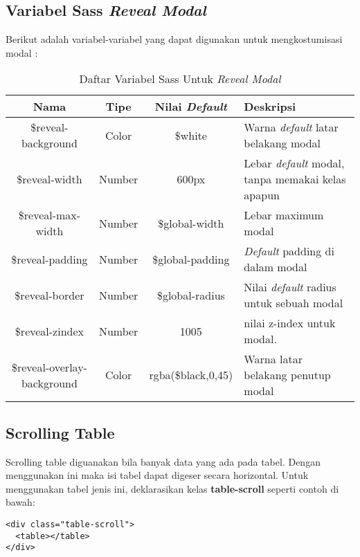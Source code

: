 \subsection{Variabel Sass \textit{Reveal Modal}}
Berikut adalah variabel-variabel yang dapat digunakan untuk mengkostumisasi modal :
\begin{center}
	\begin{table}[H]
	\begin{tabular}{|c|c|c|p{3cm}|}
 				\hline
			Nama & Tipe & Nilai \textit{Default} & Deskripsi  \\
				\hline
			 \$reveal-background & Color & \$white & Warna \textit{default} latar belakang modal \\
			 	\hline
			  \$reveal-width & Number & 600px & Lebar \textit{default} modal, tanpa memakai kelas apapun \\
				 \hline
			  \$reveal-max-width & Number & \$global-width & Lebar maximum modal \\
				 \hline
			 \$reveal-padding & Number & \$global-padding & \textit{Default} padding di dalam modal \\
			 	\hline
			  \$reveal-border & Number & \$global-radius & Nilai \textit{default} radius untuk sebuah modal \\
			 	\hline
			  \$reveal-zindex & Number & 1005 & nilai z-index untuk modal. \\
			 	\hline
			 	\$reveal-overlay-background & Color & rgba(\$black,0,45) & Warna latar belakang penutup modal \\
			 	\hline
	\end{tabular}
	\caption{Daftar Variabel Sass Untuk \textit{Reveal Modal}}
	\end{table}
\end{center}

\subsection{Scrolling Table}
Scrolling table diguanakan bila banyak data yang ada pada tabel. Dengan menggunakan ini maka isi tabel dapat digeser secara horizontal. Untuk menggunakan tabel jenis ini, deklarasikan kelas \textbf{table-scroll} seperti contoh di bawah:
\begin{lstlisting}
<div class="table-scroll">
  <table></table>
</div>
\end{lstlisting}

